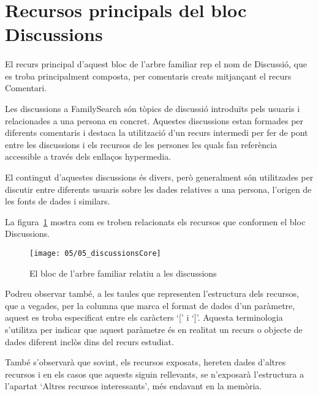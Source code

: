 \section{Recursos principals del bloc Discussions}

    \paragraph{}
    El recurs principal d'aquest bloc de l'arbre familiar rep el nom de Discussió, que es troba principalment composta, per comentaris creats mitjançant el recurs Comentari.

    Les discussions a FamilySearch són tòpics de discussió introduïts pels usuaris i relacionades a una persona en concret. Aquestes discussions estan formades per diferents comentaris i destaca la utilització d'un recurs intermedi per fer de pont entre les discussions i els recursos de les persones les quals fan referència accessible a través dels enllaços hypermedia.

    El contingut d'aquestes discussions és divers, però generalment són utilitzades per discutir entre diferents usuaris sobre les dades relatives a una persona, l'origen de les fonts de dades i similars.

    La figura~\ref{img:discussionsBloc} mostra com es troben relacionats els recursos que conformen el bloc Discussions.

    \begin{figure}[h]
        \texttt{[image: 05/05\_discussionsCore]}
        \centering
        \caption{El bloc de l'arbre familiar relatiu a les discussions}\label{img:discussionsBloc}
    \end{figure}

    Podreu observar també, a les taules que representen l'estructura dels recursos, que a vegades, per la columna que marca el format de dades d'un paràmetre, aquest es troba especificat entre els caràcters `[' i `]'. Aquesta terminologia s'utilitza per indicar que aquest paràmetre és en realitat un recurs o objecte de dades diferent inclòs dins del recurs estudiat.

    També s'observarà que sovint, els recursos exposats, hereten dades d'altres recursos i en els casos que aquests siguin rellevants, se n'exposarà l'estructura a l'apartat `Altres recursos interessants', més endavant en la memòria.

    
    
    
